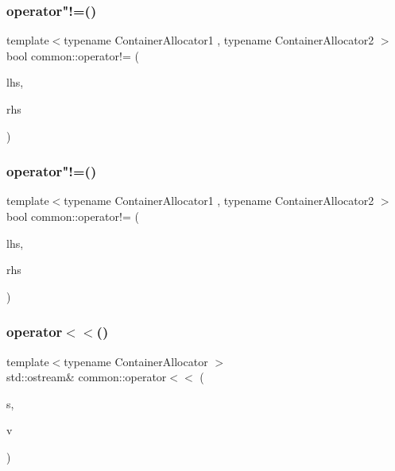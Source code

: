 \subsubsection{\texorpdfstring{operator"!=()}{operator!=()}\hspace{0.1cm}{\footnotesize\ttfamily [1/2]}}
{\footnotesize\ttfamily template$<$typename Container\+Allocator1 , typename Container\+Allocator2 $>$ \\
bool common\+::operator!= (\begin{DoxyParamCaption}\item[{const \+::\hyperlink{structcommon_1_1PointCloudSensor__}{common\+::\+Point\+Cloud\+Sensor\+\_\+}$<$ Container\+Allocator1 $>$ \&}]{lhs,  }\item[{const \+::\hyperlink{structcommon_1_1PointCloudSensor__}{common\+::\+Point\+Cloud\+Sensor\+\_\+}$<$ Container\+Allocator2 $>$ \&}]{rhs }\end{DoxyParamCaption})}

\mbox{\label{namespacecommon_afd4a49a0e5d3d1823ae5842fa54a7466}} 
\subsubsection{\texorpdfstring{operator"!=()}{operator!=()}\hspace{0.1cm}{\footnotesize\ttfamily [2/2]}}
{\footnotesize\ttfamily template$<$typename Container\+Allocator1 , typename Container\+Allocator2 $>$ \\
bool common\+::operator!= (\begin{DoxyParamCaption}\item[{const \+::\hyperlink{structcommon_1_1EgoPointClouds__}{common\+::\+Ego\+Point\+Clouds\+\_\+}$<$ Container\+Allocator1 $>$ \&}]{lhs,  }\item[{const \+::\hyperlink{structcommon_1_1EgoPointClouds__}{common\+::\+Ego\+Point\+Clouds\+\_\+}$<$ Container\+Allocator2 $>$ \&}]{rhs }\end{DoxyParamCaption})}

\mbox{\label{namespacecommon_a8fbe91682ecab877102fddadf0793d6e}} 
\subsubsection{\texorpdfstring{operator$<$$<$()}{operator<<()}\hspace{0.1cm}{\footnotesize\ttfamily [1/2]}}
{\footnotesize\ttfamily template$<$typename Container\+Allocator $>$ \\
std\+::ostream\& common\+::operator$<$$<$ (\begin{DoxyParamCaption}\item[{std\+::ostream \&}]{s,  }\item[{const \+::\hyperlink{structcommon_1_1PointCloudSensor__}{common\+::\+Point\+Cloud\+Sensor\+\_\+}$<$ Container\+Allocator $>$ \&}]{v }\end{DoxyParamCaption})}

